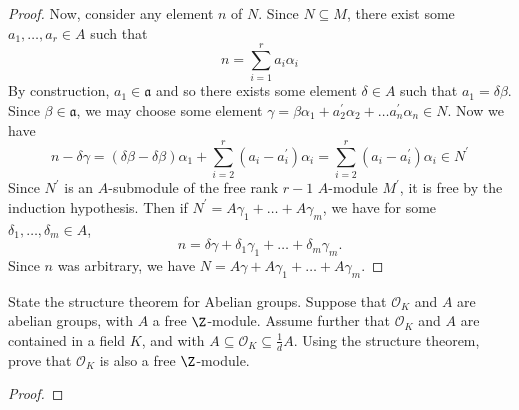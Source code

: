 \documentclass[10pt]{amsart}
\begin{document}
\begin{lem}
\begin{proof}
    Now, consider any element $n$ of $N$.
    Since $N \subseteq M$, there exist some $a_1, \ldots, a_r \in A$ such that 
    $$n = \sum_{i=1}^r a_i\alpha_i$$
    By construction, $a_1 \in \mathfrak{a}$ and so there exists some element $\delta \in A$ such that $a_1 = \delta\beta$.
    Since $\beta \in \mathfrak{a}$, we may choose some element $\gamma = \beta\alpha_1 + a_2^\prime\alpha_2 + \ldots a_n^\prime\alpha_n \in N$.
    Now we have 
    $$n - \delta\gamma = (\delta\beta - \delta\beta)\alpha_1 + \sum_{i = 2}^r (a_i - a_i^\prime)\alpha_i = \sum_{i = 2}^r (a_i - a_i^\prime)\alpha_i \in N^\prime$$
    Since $N^\prime$ is an $A$-submodule of the free rank $r-1$ $A$-module $M^\prime$, it is free by the induction hypothesis.
    Then if $N^\prime = A\gamma_1 + \ldots + A\gamma_m$, we have for some $\delta_1, \ldots, \delta_m \in A$, 
    $$n = \delta\gamma + \delta_1\gamma_1 + \ldots + \delta_m\gamma_m.$$
    Since $n$ was arbitrary, we have $N = A\gamma + A\gamma_1 + \ldots + A\gamma_m$.
  \end{proof}
\end{lem}

\begin{thm}
  State the structure theorem for Abelian groups.
  Suppose that $\mathcal{O}_K$ and $A$ are abelian groups, with $A$ a free $\Z$-module.
  Assume further that $\mathcal{O}_K$ and $A$ are contained in a field $K$, and with $A \subseteq \mathcal{O}_K \subseteq \frac{1}{d}A$.
  Using the structure theorem, prove that $\mathcal{O}_K$ is also a free $\Z$-module.

  \begin{proof}
  \end{proof}
\end{thm}
\end{document}
